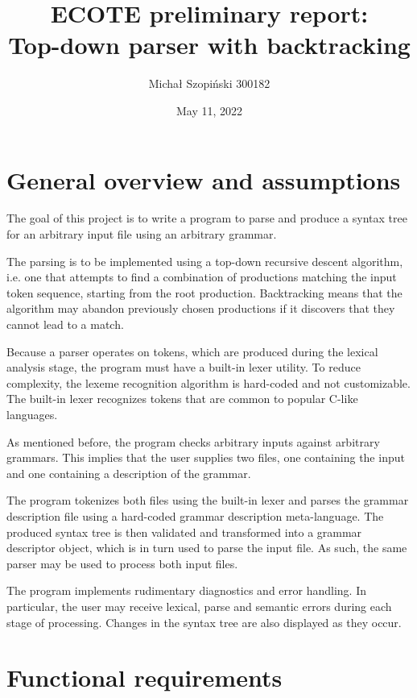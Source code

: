 \documentclass{article}
\begin{document}
	\title{ECOTE preliminary report:\\
	Top-down parser with backtracking}
	\author{Michał Szopiński 300182}
	\date{May 11, 2022}
	\maketitle

	\section{General overview and assumptions}

	The goal of this project is to write a program to parse and produce a syntax
	tree for an arbitrary input file using an arbitrary grammar.

	The parsing is to be implemented using a top-down recursive descent
	algorithm, i.e. one that attempts to find a combination of productions
	matching the input token sequence, starting from the root production.
	Backtracking means that the algorithm may abandon previously chosen
	productions if it discovers that they cannot lead to a match.

	Because a parser operates on tokens, which are produced during the lexical
	analysis stage, the program must have a built-in lexer utility. To reduce
	complexity, the lexeme recognition algorithm is hard-coded and not
	customizable. The built-in lexer recognizes tokens that are common to
	popular C-like languages.

	As mentioned before, the program checks arbitrary inputs against arbitrary
	grammars. This implies that the user supplies two files, one containing
	the input and one containing a description of the grammar.

	The program tokenizes both files using the built-in lexer and parses the
	grammar description file using a hard-coded grammar description
	meta-language. The produced syntax tree is then validated and transformed
	into a grammar descriptor object, which is in turn used to parse the input
	file. As such, the same parser may be used to process both input files.

	The program implements rudimentary diagnostics and error handling. In
	particular, the user may receive lexical, parse and semantic errors during
	each stage of processing. Changes in the syntax tree are also displayed
	as they occur.

	\section{Functional requirements}
\end{document}
